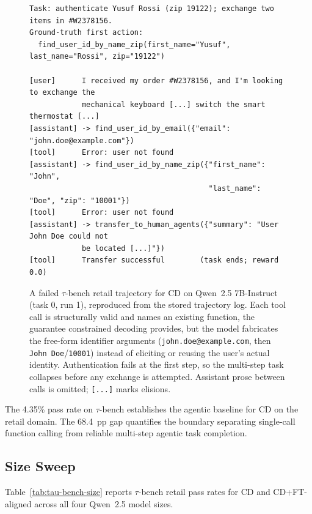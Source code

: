 \begin{figure}[ht]
\centering
\begin{lstlisting}[style=promptbox]
Task: authenticate Yusuf Rossi (zip 19122); exchange two items in #W2378156.
Ground-truth first action:
  find_user_id_by_name_zip(first_name="Yusuf", last_name="Rossi", zip="19122")

[user]      I received my order #W2378156, and I'm looking to exchange the
            mechanical keyboard [...] switch the smart thermostat [...]
[assistant] -> find_user_id_by_email({"email": "john.doe@example.com"})
[tool]      Error: user not found
[assistant] -> find_user_id_by_name_zip({"first_name": "John",
                                         "last_name": "Doe", "zip": "10001"})
[tool]      Error: user not found
[assistant] -> transfer_to_human_agents({"summary": "User John Doe could not
            be located [...]"})
[tool]      Transfer successful        (task ends; reward 0.0)
\end{lstlisting}
\caption{A failed $\tau$-bench retail trajectory for CD on Qwen~2.5
7B-Instruct (task 0, run 1), reproduced from the stored trajectory log.
Each tool call is structurally valid and names an existing function, the
guarantee constrained decoding provides, but the model fabricates the
free-form identifier arguments (\texttt{john.doe@example.com}, then
\texttt{John Doe}/\texttt{10001}) instead of eliciting or reusing the
user's actual identity. Authentication fails at the first step, so the
multi-step task collapses before any exchange is attempted. Assistant prose
between calls is omitted; \texttt{[...]} marks elisions.}
\label{fig:tau-failure}
\end{figure}

The 4.35\% pass rate on $\tau$-bench establishes the agentic baseline for
CD on the retail domain. The 68.4~pp gap quantifies the boundary
separating single-call function calling from reliable multi-step agentic
task completion.

\subsection{Size Sweep}
\label{sec:tau-bench-size}

Table~\ref{tab:tau-bench-size} reports $\tau$-bench retail pass rates for CD
and CD+FT-aligned across all four Qwen~2.5 model sizes.

